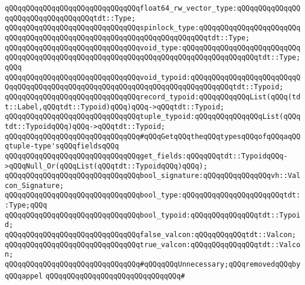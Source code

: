 \verb|qQQqqQQqqQQqqQQqqQQqqQQqqQQqqQQqfloat64_rw_vector_type:qQQqqQQqqQQqqQQqqQQqqQQqqQQqqQQqqQQqtdt::Type;|\newline
\verb|qQQqqQQqqQQqqQQqqQQqqQQqqQQqqQQqspinlock_type:qQQqqQQqqQQqqQQqqQQqqQQqqQQqqQQqqQQqqQQqqQQqqQQqqQQqqQQqqQQqqQQqqQQqqQQqtdt::Type;|\newline
\newline
\verb|qQQqqQQqqQQqqQQqqQQqqQQqqQQqqQQqvoid_type:qQQqqQQqqQQqqQQqqQQqqQQqqQQqqQQqqQQqqQQqqQQqqQQqqQQqqQQqqQQqqQQqqQQqqQQqqQQqqQQqqQQqqQQqtdt::Type;qQQq|\newline
\verb|qQQqqQQqqQQqqQQqqQQqqQQqqQQqqQQqvoid_typoid:qQQqqQQqqQQqqQQqqQQqqQQqqQQqqQQqqQQqqQQqqQQqqQQqqQQqqQQqqQQqqQQqqQQqqQQqqQQqqQQqtdt::Typoid;|\newline
\newline
\verb|qQQqqQQqqQQqqQQqqQQqqQQqqQQqqQQqrecord_typoid:qQQqqQQqqQQqList(qQQq(tdt::Label,qQQqtdt::Typoid)qQQq)qQQq->qQQqtdt::Typoid;|\newline
\verb|qQQqqQQqqQQqqQQqqQQqqQQqqQQqqQQqtuple_typoid:qQQqqQQqqQQqqQQqList(qQQqtdt::TypoidqQQq)qQQq->qQQqtdt::Typoid;|\newline
\newline
\verb|qQQqqQQqqQQqqQQqqQQqqQQqqQQqqQQq#qQQqGetqQQqtheqQQqtypesqQQqofqQQqaqQQqtuple-type'sqQQqfieldsqQQq|\newline
\newline
\verb|qQQqqQQqqQQqqQQqqQQqqQQqqQQqqQQqget_fields:qQQqqQQqtdt::TypoidqQQq->qQQqNull_Or(qQQqList(qQQqtdt::TypoidqQQq)qQQq);|\newline
\newline
\verb|qQQqqQQqqQQqqQQqqQQqqQQqqQQqqQQqbool_signature:qQQqqQQqqQQqqQQqvh::Valcon_Signature;|\newline
\newline
\verb|qQQqqQQqqQQqqQQqqQQqqQQqqQQqqQQqbool_type:qQQqqQQqqQQqqQQqqQQqqQQqtdt::Type;qQQq|\newline
\verb|qQQqqQQqqQQqqQQqqQQqqQQqqQQqqQQqbool_typoid:qQQqqQQqqQQqqQQqtdt::Typoid;|\newline
\newline
\verb|qQQqqQQqqQQqqQQqqQQqqQQqqQQqqQQqfalse_valcon:qQQqqQQqqQQqtdt::Valcon;|\newline
\verb|qQQqqQQqqQQqqQQqqQQqqQQqqQQqqQQqtrue_valcon:qQQqqQQqqQQqqQQqtdt::Valcon;|\newline
\newline
\verb|qQQqqQQqqQQqqQQqqQQqqQQqqQQqqQQq#qQQqqQQqUnnecessary;qQQqremovedqQQqbyqQQqappel|\newline
\verb|qQQqqQQqqQQqqQQqqQQqqQQqqQQqqQQq#|\newline
